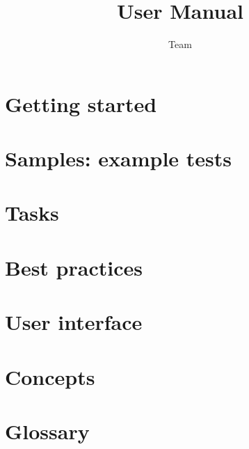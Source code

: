 \documentclass[en,a4paper,twoside,manual,guidancer]{bxreport}
\begin{document}
\title{\jb{} User Manual}
\author*{\jb{} Team}{}
\maketitle



\tableofcontents
\renewcommand{\bxcomment}[2]{}%
\clearpage
\chapter{Getting started}
\label{Gettingstarted}


\clearpage
\chapter{Samples: example tests}
\label{Samples}


\clearpage
 \chapter{Tasks}
 \label{Tasks}


\clearpage
\chapter{Best practices}
\label{BestPractices}


\clearpage
\chapter{User interface}
\label{userinterface}


\clearpage
\chapter{Concepts}
\label{Concepts}


\clearpage
\chapter{Glossary}
\label{Glossary}


\clearpage
\printindex
\end{document}
